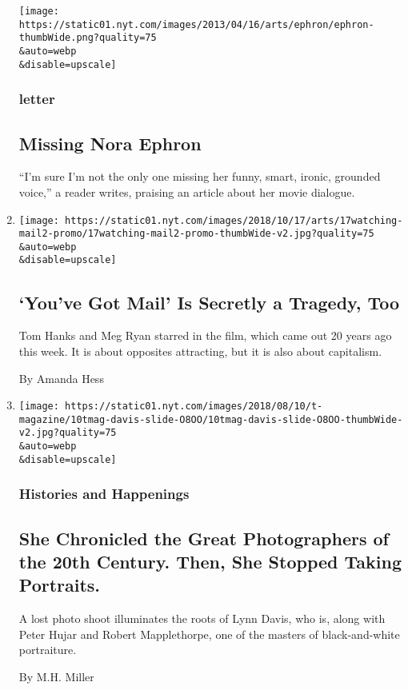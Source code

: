 \begin{enumerate}
  \texttt{[image: https://static01.nyt.com/images/2013/04/16/arts/ephron/ephron-thumbWide.png?quality=75\\\&auto=webp\\\&disable=upscale]}

  \hypertarget{letter}{%
  \subsubsection{letter}\label{letter}}

  \hypertarget{missing-nora-ephron}{%
  \subsection{Missing Nora Ephron}\label{missing-nora-ephron}}

  ``I'm sure I'm not the only one missing her funny, smart, ironic,
  grounded voice,'' a reader writes, praising an article about her movie
  dialogue.
\item
  \href{/2018/12/19/movies/youve-got-mail.html}{}

  \texttt{[image: https://static01.nyt.com/images/2018/10/17/arts/17watching-mail2-promo/17watching-mail2-promo-thumbWide-v2.jpg?quality=75\\\&auto=webp\\\&disable=upscale]}

  \hypertarget{youve-got-mail-is-secretly-a-tragedy-too}{%
  \subsection{`You've Got Mail' Is Secretly a Tragedy,
  Too}\label{youve-got-mail-is-secretly-a-tragedy-too}}

  Tom Hanks and Meg Ryan starred in the film, which came out 20 years
  ago this week. It is about opposites attracting, but it is also about
  capitalism.

  By Amanda Hess
\item
  \href{/2018/08/10/t-magazine/lynn-davis-photographs.html}{}

  \texttt{[image: https://static01.nyt.com/images/2018/08/10/t-magazine/10tmag-davis-slide-O8OO/10tmag-davis-slide-O8OO-thumbWide-v2.jpg?quality=75\\\&auto=webp\\\&disable=upscale]}

  \hypertarget{histories-and-happenings}{%
  \subsubsection{Histories and
  Happenings}\label{histories-and-happenings}}

  \hypertarget{she-chronicled-the-great-photographers-of-the-20th-century-then-she-stopped-taking-portraits}{%
  \subsection{She Chronicled the Great Photographers of the 20th
  Century. Then, She Stopped Taking
  Portraits.}\label{she-chronicled-the-great-photographers-of-the-20th-century-then-she-stopped-taking-portraits}}

  A lost photo shoot illuminates the roots of Lynn Davis, who is, along
  with Peter Hujar and Robert Mapplethorpe, one of the masters of
  black-and-white portraiture.

  By M.H. Miller
\end{enumerate}

